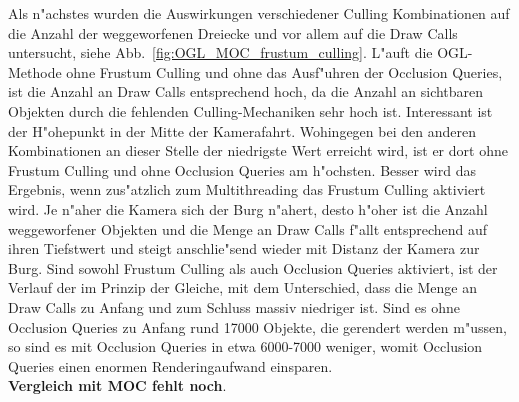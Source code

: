 \documentclass[journal]{vgtc}
\begin{document}
Als n"achstes wurden die Auswirkungen verschiedener Culling Kombinationen auf die Anzahl der weggeworfenen Dreiecke und vor allem auf die Draw Calls untersucht, siehe Abb.\ \ref{fig:OGL_MOC_frustum_culling}. L"auft die OGL-Methode ohne Frustum Culling und ohne das Ausf"uhren der Occlusion Queries, ist die Anzahl an Draw Calls entsprechend hoch, da die Anzahl an sichtbaren Objekten durch die fehlenden Culling-Mechaniken sehr hoch ist. Interessant ist der H"ohepunkt in der Mitte der Kamerafahrt. Wohingegen bei den anderen Kombinationen an dieser Stelle der niedrigste Wert erreicht wird, ist er dort ohne Frustum Culling und ohne Occlusion Queries am h"ochsten. Besser wird das Ergebnis, wenn zus"atzlich zum Multithreading das Frustum Culling aktiviert wird. Je n"aher die Kamera sich der Burg n"ahert, desto h"oher ist die Anzahl weggeworfener Objekten und die Menge an Draw Calls f"allt entsprechend auf ihren Tiefstwert und steigt anschlie"send wieder mit Distanz der Kamera zur Burg. Sind sowohl Frustum Culling als auch Occlusion Queries aktiviert, ist der Verlauf der im Prinzip der Gleiche, mit dem Unterschied, dass die Menge an Draw Calls zu Anfang und zum Schluss massiv niedriger ist. Sind es ohne Occlusion Queries zu Anfang rund 17000 Objekte, die gerendert werden m"ussen, so sind es mit Occlusion Queries in etwa 6000-7000 weniger, womit Occlusion Queries einen enormen Renderingaufwand einsparen.\\
\textbf{Vergleich mit MOC fehlt noch}.\\
\end{document}
